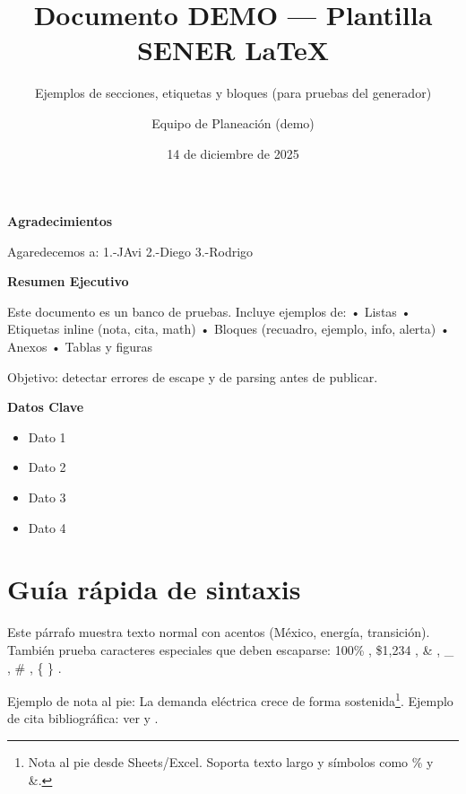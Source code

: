 \documentclass{sener2025}
\title{Documento DEMO — Plantilla SENER LaTeX}
\subtitle{Ejemplos de secciones, etiquetas y bloques (para pruebas del generador)}
\author{Equipo de Planeación (demo)}
\date{14 de diciembre de 2025}
\begin{document}

\tableofcontents
\newpage

\listafiguras
\newpage

\listatablas
\newpage

\clearpage
\begin{center}
{\Large\patriafont\bfseries\color{gobmxGuinda}Agradecimientos}\\[1cm]
\end{center}

Agaredecemos a:
1.-JAvi
2.-Diego
3.-Rodrigo

\clearpage
\begin{center}
{\Large\patriafont\bfseries\color{gobmxGuinda}Resumen Ejecutivo}\\[1cm]
\end{center}

Este documento es un banco de pruebas. Incluye ejemplos de:
• Listas
• Etiquetas inline (nota, cita, math)
• Bloques (recuadro, ejemplo, info, alerta)
• Anexos
• Tablas y figuras

Objetivo: detectar errores de escape y de parsing antes de publicar.

\clearpage
\begin{center}
{\Large\patriafont\bfseries\color{gobmxGuinda}Datos Clave}\\[1cm]
\end{center}

\begin{itemize}
  \item Dato 1
  \item Dato 2
  \item Dato 3
  \item Dato 4
\end{itemize}


\section{Guía rápida de sintaxis}

Este párrafo muestra texto normal con acentos (México, energía, transición).
También prueba caracteres especiales que deben escaparse: 100\% , \$1,234 , \& , \_ , \# , \{ \} .

Ejemplo de nota al pie: La demanda eléctrica crece de forma sostenida\footnote{Nota al pie desde Sheets/Excel. Soporta texto largo y símbolos como \% y \&.}.
Ejemplo de cita bibliográfica: ver \cite{demo_sener2025} y \cite{cenace2023_flex}.
\end{document}
